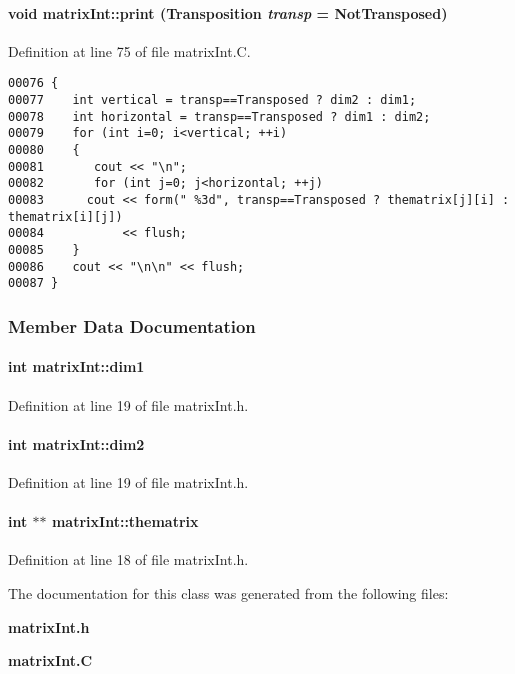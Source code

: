 \paragraph{\setlength{\rightskip}{0pt plus 5cm}void matrix\-Int::print ({\bf Transposition} {\em transp} = Not\-Transposed)}\hfill



Definition at line 75 of file matrix\-Int.C.\small\begin{verbatim}00076 {
00077    int vertical = transp==Transposed ? dim2 : dim1;
00078    int horizontal = transp==Transposed ? dim1 : dim2;
00079    for (int i=0; i<vertical; ++i)
00080    {
00081       cout << "\n";
00082       for (int j=0; j<horizontal; ++j)
00083      cout << form(" %3d", transp==Transposed ? thematrix[j][i] : thematrix[i][j])
00084           << flush;
00085    }
00086    cout << "\n\n" << flush;
00087 }
\end{verbatim}\normalsize 


\subsubsection{Member Data Documentation}
\label{matrixInt_o1}
\paragraph{\setlength{\rightskip}{0pt plus 5cm}int matrix\-Int::dim1\hspace{0.3cm}{\tt  [private]}}\hfill



Definition at line 19 of file matrix\-Int.h.\label{matrixInt_o2}
\paragraph{\setlength{\rightskip}{0pt plus 5cm}int matrix\-Int::dim2\hspace{0.3cm}{\tt  [private]}}\hfill



Definition at line 19 of file matrix\-Int.h.\label{matrixInt_o0}
\paragraph{\setlength{\rightskip}{0pt plus 5cm}int $\ast$$\ast$ matrix\-Int::thematrix\hspace{0.3cm}{\tt  [private]}}\hfill



Definition at line 18 of file matrix\-Int.h.

The documentation for this class was generated from the following files:\begin{CompactItemize}
\item 
{\bf matrix\-Int.h}\item 
{\bf matrix\-Int.C}\end{CompactItemize}
